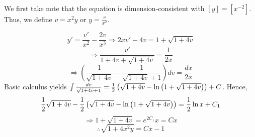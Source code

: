 \item

We first take note that the equation is dimension-consistent with $[y] = [x^{-2}]$.
Thus, we define $v = x^2 y$ or $y = \frac{v}{x^2}$.

\[
	y' = \frac{v'}{x^2} - \frac{2v}{x^3}
	\Rightarrow 2xv' - 4v = 1 + \sqrt{1 + 4v}
\]
\[
	\Rightarrow \frac{v'}{1 + 4v + \sqrt{1 + 4v}} = \frac{1}{2x}
\]
\[
	\Rightarrow \left( \frac{1}{\sqrt{1 + 4v}} - \frac{1}{\sqrt{1 + 4v} + 1} \right) dv = \frac{dx}{2x}
\]
Basic calculus yields $\int \frac{dv}{\sqrt{1 + 4v} + 1} = \frac{1}{2} \left( \sqrt{1 + 4v} - \ln \left( 1 + \sqrt{1 + 4v}\right) \right) + C$.
Hence,
\[
	\frac{1}{2} \sqrt{1 + 4v} - \frac{1}{2} \left( \sqrt{1 + 4v} - \ln \left( 1 + \sqrt{1 + 4v}\right) \right) = \frac{1}{2} \ln x + C_1
\]
\[
	\Rightarrow 1 + \sqrt{1 + 4v} = e^{2C_1} x = Cx
\]
\[
	\therefore \sqrt{1 + 4x^2 y} = Cx - 1
\]
